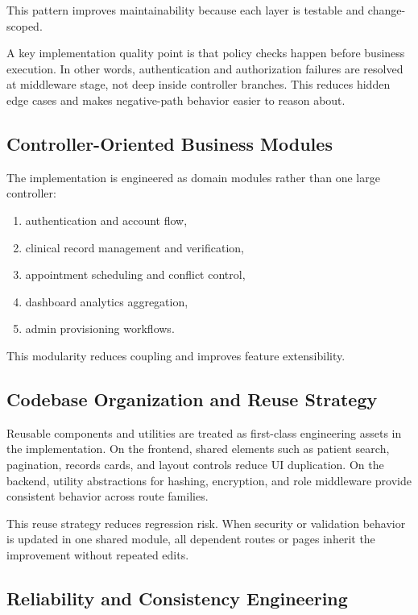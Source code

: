 \documentclass[12pt,a4paper]{report}
\begin{document}
This pattern improves maintainability because each layer is testable and change-scoped.

A key implementation quality point is that policy checks happen before business execution. In other words, authentication and authorization failures are resolved at middleware stage, not deep inside controller branches. This reduces hidden edge cases and makes negative-path behavior easier to reason about.

\subsection{Controller-Oriented Business Modules}

The implementation is engineered as domain modules rather than one large controller:

\begin{enumerate}
\item authentication and account flow,
\item clinical record management and verification,
\item appointment scheduling and conflict control,
\item dashboard analytics aggregation,
\item admin provisioning workflows.
\end{enumerate}

This modularity reduces coupling and improves feature extensibility.

\subsection{Codebase Organization and Reuse Strategy}

Reusable components and utilities are treated as first-class engineering assets in the implementation. On the frontend, shared elements such as patient search, pagination, records cards, and layout controls reduce UI duplication. On the backend, utility abstractions for hashing, encryption, and role middleware provide consistent behavior across route families.

This reuse strategy reduces regression risk. When security or validation behavior is updated in one shared module, all dependent routes or pages inherit the improvement without repeated edits.

\subsection{Reliability and Consistency Engineering}
\end{document}
